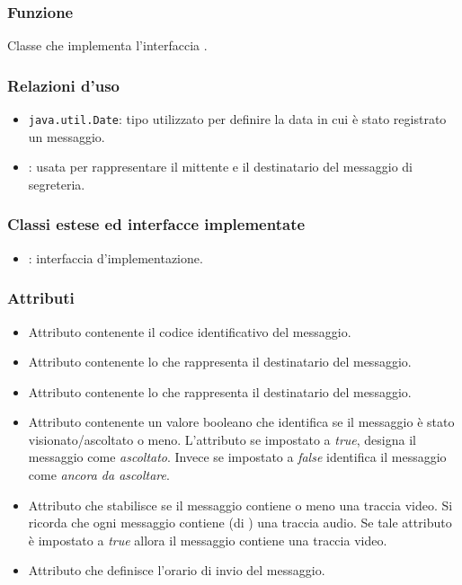 
\subsubsection*{Funzione}
Classe che implementa l'interfaccia .

\subsubsection*{Relazioni d'uso}
\begin{itemize}
	\item \texttt{java.util.Date}: tipo utilizzato per definire la data in cui è stato registrato un messaggio.
	\item {}: usata per rappresentare il mittente e il destinatario del messaggio di segreteria.
\end{itemize}

\subsubsection*{Classi estese ed interfacce implementate}
\begin{itemize}
	\item {}: interfaccia d'implementazione.
\end{itemize}

\subsubsection*{Attributi}

\begin{itemize}
	\item{}
	Attributo contenente il codice identificativo del messaggio.
	\item{}
	Attributo contenente lo  che rappresenta il destinatario del messaggio.
	\item{}
	Attributo contenente lo  che rappresenta il destinatario del messaggio.
	\item{}
	Attributo contenente un valore booleano che identifica se il messaggio è stato visionato/ascoltato o meno. L'attributo se impostato a \textit{true}, designa il messaggio come \textit{ascoltato}. Invece se impostato a \textit{false} identifica il messaggio come \textit{ancora da ascoltare}.
	\item{}
	Attributo che stabilisce se il messaggio contiene o meno una traccia video. Si ricorda che ogni messaggio contiene (di ) una traccia audio. Se tale attributo è impostato a \textit{true} allora il messaggio contiene una traccia video.
	\item{}
	Attributo che definisce l'orario di invio del messaggio.
\end{itemize}

